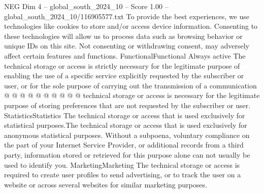 \begin{textsample}{NEG Dim 4 – global\_south\_2024\_10 – Score 1.00 – global\_south\_2024\_10/116905577.txt}
To provide the best experiences, we use technologies like cookies to store and/or access device information.
Consenting to these technologies will allow us to process data such as browsing behavior or unique IDs on this site.
Not consenting or withdrawing consent, may adversely affect certain features and functions.
FunctionalFunctional Always active The technical storage or access is strictly necessary for the legitimate purpose of enabling the use of a specific service explicitly requested by the subscriber or user, or for the sole purpose of carrying out the transmission of a communication @ @ @ @ @ @ @ @ @ @ technical storage or access is necessary for the legitimate purpose of storing preferences that are not requested by the subscriber or user.
StatisticsStatistics The technical storage or access that is used exclusively for statistical purposes.The technical storage or access that is used exclusively for anonymous statistical purposes.
Without a subpoena, voluntary compliance on the part of your Internet Service Provider, or additional records from a third party, information stored or retrieved for this purpose alone can not usually be used to identify you.
MarketingMarketing The technical storage or access is required to create user profiles to send advertising, or to track the user on a website or across several websites for similar marketing purposes.

\end{textsample}
